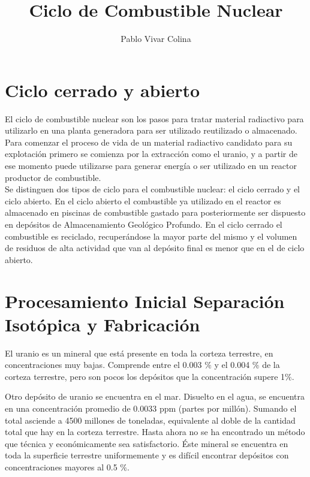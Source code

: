 \documentclass[]{article}
\title{Ciclo de Combustible Nuclear}
\author{Pablo Vivar Colina}
\begin{document}
	

\maketitle

\tableofcontents  %



\section{Ciclo cerrado y abierto}

El ciclo de combustible nuclear son los pasos para tratar material radiactivo para utilizarlo en una planta generadora para ser utilizado reutilizado o almacenado.\\

Para comenzar el proceso de vida de un material radiactivo candidato para su explotación primero se comienza por la extracción como el uranio, y a partir de ese momento puede utilizarse para generar energía o ser utilizado en un reactor productor de combustible.\\

Se distinguen dos tipos de ciclo para el combustible nuclear: el ciclo cerrado y el ciclo abierto. En el ciclo abierto el combustible ya utilizado en el reactor es almacenado en piscinas de combustible gastado para posteriormente ser dispuesto en depósitos de Almacenamiento Geológico Profundo. En el ciclo cerrado el combustible es reciclado, recuperándose la mayor parte del mismo y el volumen de residuos de alta actividad que van al depósito final es menor que en el de ciclo abierto.\\


\section{Procesamiento Inicial Separación Isotópica y Fabricación}

El uranio es un mineral que está presente en toda la corteza terrestre, en concentraciones muy bajas. Comprende entre el 0.003 $\%$ y el 0.004 $\%$ de la corteza terrestre, pero son pocos los depósitos que la concentración supere 1$\%$.

Otro depósito de uranio se encuentra en el mar. Disuelto en el agua, se encuentra en una concentración promedio de 0.0033 ppm (partes por millón). Sumando el total asciende a 4500 millones de toneladas, equivalente al doble de la cantidad total que hay en la corteza terrestre. Hasta ahora no se ha encontrado un método que técnica y económicamente sea satisfactorio. Éste mineral se encuentra en toda la superficie terrestre uniformemente y es difícil encontrar depósitos con concentraciones mayores al 0.5 $\%$.\\
\end{document}
